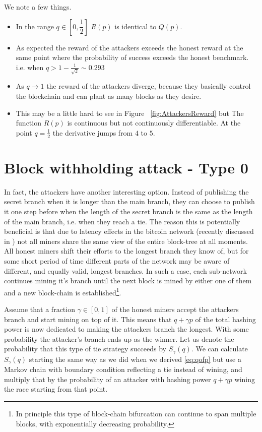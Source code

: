 \documentclass[letterpaper,12pt]{report}
\theoremstyle{plain}
\theoremstyle{definition}
\begin{document}
We note a few things.
\begin{itemize}
\item In the range $q\in[0,\dfrac{1}{2}]$ $R(p)$ is identical to $Q(p)$.
  \item As expected the reward of the attackers exceeds the honest reward at the same point where the probability of success exceeds the honest benchmark. i.e. when $q>1-\frac{1}{\sqrt{2}} \sim 0.293$
  \item As $q\rightarrow 1$ the reward of the attackers diverge, because they basically control the blockchain and can plant as many blocks as they desire.
  \item This may be a little hard to see in Figure ~\ref{fig:AttackersReward} but The function $R(p)$ is continuous but not continuously differentiable. At the point $q=\frac{1}{2}$ the derivative jumps from $4$ to $5$.
\end{itemize}

\section{Block withholding attack - Type 0}
In fact, the attackers have another interesting option. Instead of publishing the secret branch when it is longer than the main branch, they can choose to publish it one step before when the length of the secret branch is the same as the length of the main branch, i.e. when they reach a tie. The reason this is potentially beneficial is that due to latency effects in the bitcoin network (recently discussed in \cite{zoharetal}) not all miners share the same view of the entire block-tree at all moments. All honest miners shift their efforts to the longest branch they know of, but for some short period of time different parts of the network may be aware of different, and equally valid, longest branches. In such a case, each sub-network continues mining it's branch until the next block is mined by either one of them and a new block-chain is established\footnote{In principle this type of block-chain bifurcation can continue to span multiple blocks, with exponentially decreasing probability.}. 

Assume that a fraction $\gamma \in [0,1]$ of the honest miners accept the attackers branch and start mining on top of it. This means that $q+\gamma p$ of the total hashing power is now dedicated to making the attackers branch the longest. With some probability the attacker's branch ends up as the winner. Let us denote the probability that this type of tie strategy succeeds by $S_{\gamma}(q)$.
We can calculate $S_{\gamma}(q)$ starting the same way as we did when we derived \ref{eq:qofp} but use a Markov chain with boundary condition reflecting a tie instead of wining, and multiply that by the probability of an attacker with hashing power $q+\gamma p$ wining the race starting from that point.
\end{document}
